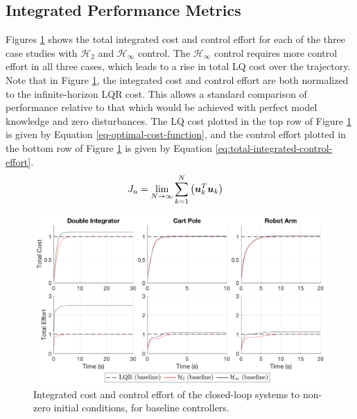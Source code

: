 \subsection{Integrated Performance Metrics}
Figures \ref{fig:baseline_integrated_cost} shows the total integrated cost and control effort for each of the three case studies with $\mathcal{H}_{2}$ and $\mathcal{H}_{\infty}$ control.  The $\mathcal{H}_{\infty}$ control requires more control effort in all three cases, which leads to a rise in total LQ cost over the trajectory.  Note that in Figure \ref{fig:baseline_integrated_cost}, the integrated cost and control effort are both normalized to the infinite-horizon LQR cost.  This allows a standard comparison of performance relative to that which would be achieved with perfect model knowledge and zero disturbances.  The LQ cost plotted in the top row of Figure \ref{fig:baseline_integrated_cost} is given by Equation \ref{eq-optimal-cost-function}, and the control effort plotted in the bottom row of Figure \ref{fig:baseline_integrated_cost} is given by Equation \ref{eq:total-integrated-control-effort}.
\begin{equation}
\label{eq:total-integrated-control-effort}
\begin{aligned}
	J_{u} &= \lim_{N \to \infty} \sum_{k = 1}^{N} \big{(} \vb*{u}_{k}^{T} \vb*{u}_{k} \big{)}
\end{aligned}
\end{equation}

\begin{figure}[H]
\centering
	\includegraphics[width=\textwidth]{figures/baseline_integrated_cost.png}
\caption{Integrated cost and control effort of the closed-loop systems to non-zero initial conditions, for baseline controllers.}
\label{fig:baseline_integrated_cost}
\end{figure}

